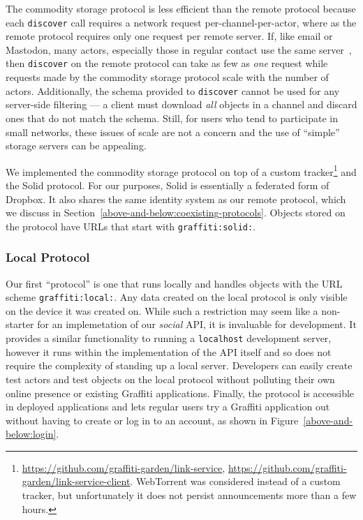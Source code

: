 The commodity storage protocol is less efficient than the remote protocol because each
\texttt{discover} call requires a network request per-channel-per-actor,
where as the remote protocol requires only one request per remote server.
If, like email or Mastodon, many actors, especially those in regular contact
use the same server~\cite{mastodonchallenges},
then \texttt{discover} on the remote protocol can take as
few as \emph{one} request while requests made by
the commodity storage protocol scale with the number of actors.
Additionally, the schema provided to \texttt{discover} cannot be used for any
server-side filtering --- a client must download \emph{all} objects in a channel
and discard ones that do not match the schema.
Still, for users who tend to participate in small networks, these issues
of scale are not a concern and the use of ``simple'' storage servers can be appealing.

We implemented the commodity storage protocol
on top of a custom tracker\footnote{
    \url{https://github.com/graffiti-garden/link-service},
    \url{https://github.com/graffiti-garden/link-service-client}.
    WebTorrent was considered instead of a custom tracker,
    but unfortunately it does not persist announcements more than a few hours.
} and the Solid protocol.
For our purposes, Solid is essentially a federated form of Dropbox.
It also shares the same identity system as our remote protocol,
which we discuss in Section~\ref{above-and-below:coexisting-protocols}.
Objects stored on the protocol have URLs that start with \texttt{graffiti:solid:}.

\subsubsection{Local Protocol}

Our first ``protocol'' is one that runs locally
and handles objects with the URL scheme \texttt{graffiti:local:}.
Any data created on the local protocol is only visible on the device
it was created on.
While such a restriction may seem like a non-starter for an implemetation
of our \emph{social} API, it is invaluable for development.
It provides a similar functionality to running a \texttt{localhost} development server,
however it runs within the implementation of the API itself and so
does not require the complexity of standing up a local server.
Developers can easily create test actors and test objects on the local protocol
without polluting their own online presence or existing Graffiti applications.
Finally, the protocol is accessible in deployed applications
and lets regular users try a Graffiti application out without
having to create or log in to an account, as shown in
Figure~\ref{above-and-below:login}.

